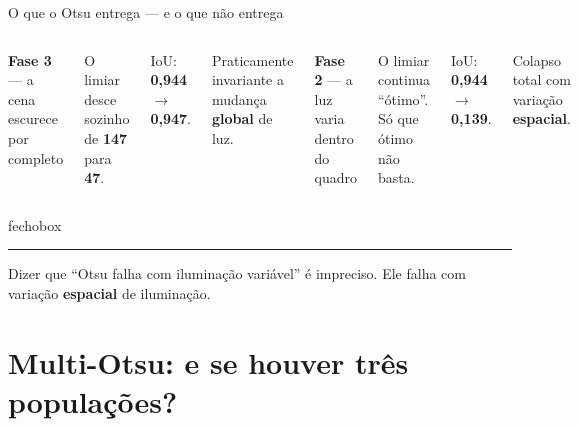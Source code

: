 \documentclass[aspectratio=169,12pt]{beamer}
\newcommand{\num}[1]{\textcolor{brasa}{\textbf{#1}}}
\newenvironment{fecho}
  {\begin{beamercolorbox}[wd=\textwidth, sep=.75em, leftskip=.6em]{fechobox}%
   \hspace{-.6em}\textcolor{brasa}{\rule[-.35em]{2.5pt}{1.15em}}\hspace{.5em}\ignorespaces}
  {\end{beamercolorbox}}
\begin{document}
\begin{frame}{O que o Otsu entrega — e o que não entrega}

  \begin{columns}[T,onlytextwidth]
      \textbf{Fase 3} — a cena escurece por completo

      \vspace{.5em}
      O limiar desce sozinho de \num{147} para \num{47}.

      \vspace{.5em}
      IoU: \textbf{0,944} $\rightarrow$ \textbf{0,947}.

      \vspace{.5em}
      \textcolor{cAdapt}{Praticamente invariante a mudança \textbf{global} de
      luz.}

      \textbf{Fase 2} — a luz varia dentro do quadro

      \vspace{.5em}
      O limiar continua ``ótimo''. Só que ótimo não basta.

      \vspace{.5em}
      IoU: \textbf{0,944} $\rightarrow$ \textcolor{cMulti}{\textbf{0,139}}.

      \vspace{.5em}
      \textcolor{cMulti}{Colapso total com variação \textbf{espacial}.}
  \end{columns}

  \vspace{1.2em}
  \begin{fecho}
    Dizer que ``Otsu falha com iluminação variável'' é \alert{impreciso}.
    Ele falha com variação \textbf{espacial} de iluminação.
  \end{fecho}

\end{frame}

\section{Multi-Otsu: e se houver três populações?}
\end{document}
